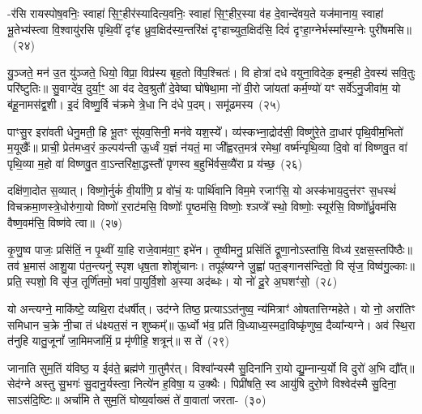-र॑सि रायस्पोष॒वनिः॒ स्वाहा॑ सि॒ꣳ॒हीर॑स्यादित्य॒वनिः॒ स्वाहा॑ सि॒ꣳ॒हीर॒स्या व॑ह दे॒वान्दे॑वय॒ते यज॑मानाय॒ स्वाहा॑ भू॒तेभ्य॑स्त्वा वि॒श्वायु॑रसि पृथि॒वीं दृꣳ॑ह ध्रुव॒क्षिद॑स्य॒न्तरि॑क्षं दृꣳहाच्युत॒क्षिद॑सि॒ दिवं॑ दृꣳहा॒ग्नेर्भस्मा᳚स्य॒ग्नेः पुरी॑षमसि॥~(२४)

{\anuvakamend[{नाम॑ सुप्रजा॒वनिः॒ स्वाहा॑ सि॒ꣳ॒हीः पञ्च॑त्रिꣳशच्च}]}%

यु॒ञ्जते॒ मन॑ उ॒त यु॑ञ्जते॒ धियो॒ विप्रा॒ विप्र॑स्य बृह॒तो वि॑प॒श्चितः॑। वि होत्रा॑ दधे वयुना॒विदेक॒ इन्म॒ही दे॒वस्य॑ सवि॒तुः परि॑ष्टुतिः॥ सु॒वाग्दे॑व॒ दुर्या॒ꣳ॒ आ व॑द देव॒श्रुतौ॑ दे॒वेष्वा घो॑षेथा॒मा नो॑ वी॒रो जा॑यतां कर्म॒ण्यो॑ यꣳ सर्वे॑\-ऽनु॒जीवा॑म॒ यो ब॑हू॒नामस॑द्व॒शी। इ॒दं विष्णु॒र्वि च॑क्रमे त्रे॒धा नि द॑धे प॒दम्। समू॑ढमस्य~(२५)

पाꣳसु॒र इरा॑वती धेनु॒मती॒ हि भू॒तꣳ सू॑यव॒सिनी॒ मन॑वे यश॒स्ये᳚। व्य॑स्कभ्ना॒द्रोद॑सी॒ विष्णु॑रे॒ते दा॒धार॑ पृथि॒वीम॒भितो॑ म॒यूखैः᳚॥ प्राची॒ प्रेत॑मध्व॒रं क॒ल्पय॑न्ती ऊ॒र्ध्वं य॒ज्ञं न॑यतं॒ मा जी᳚ह्वरत॒मत्र॑ रमेथां॒ वर्ष्म॑न्पृथि॒व्या दि॒वो वा॑ विष्णवु॒त वा॑ पृथि॒व्या म॒हो वा॑ विष्णवु॒त वा॒\-ऽन्तरि॑क्षा॒द्धस्तौ॑ पृणस्व ब॒हुभि॑र्वस॒व्यै॑रा प्र य॑च्छ॒~(२६)

दक्षि॑णा॒दोत स॒व्यात्। विष्णो॒र्नुकं॑ वी॒र्या॑णि॒ प्र वो॑चं॒ यः पार्थि॑वानि विम॒मे रजाꣳ॑सि॒ यो अस्क॑भाय॒दुत्त॑रꣳ स॒धस्थं॑ विचक्रमा॒णस्त्रे॒धोरु॑गा॒यो विष्णो॑ र॒राट॑मसि॒ विष्णोः᳚ पृ॒ष्ठम॑सि॒ विष्णोः॒ श्ञप्त्रे᳚ स्थो॒ विष्णोः॒ स्यूर॑सि॒ विष्णो᳚र्ध्रु॒वम॑सि वैष्ण॒वम॑सि॒ विष्ण॑वे त्वा॥~(२७)

{\anuvakamend[{अ॒स्य॒ य॒च्छैका॒न्नच॑त्वारि॒ꣳ॒शच्च॑}]}%

कृ॒णु॒ष्व पाजः॒ प्रसि॑तिं॒ न पृ॒थ्वीं या॒हि राजे॒वाम॑वा॒ꣳ॒ इभे॑न। तृ॒ष्वीमनु॒ प्रसि॑तिं द्रूणा॒नो\-ऽस्ता॑सि॒ विध्य॑ र॒क्षस॒स्तपि॑ष्ठैः॥ तव॑ भ्र॒मास॑ आशु॒या प॑त॒न्त्यनु॑ स्पृश धृष॒ता शोशु॑चानः। तपूꣴ॑ष्यग्ने जु॒ह्वा॑ पत॒ङ्गानस॑न्दितो॒ वि सृ॑ज॒ विष्व॑गु॒ल्काः॥ प्रति॒ स्पशो॒ वि सृ॑ज॒ तूर्णि॑तमो॒ भवा॑ पा॒युर्वि॒शो अ॒स्या अद॑ब्धः। यो नो॑ दू॒रे अ॒घशꣳ॑सो॒~(२८)

यो अन्त्यग्ने॒ माकि॑ष्टे॒ व्यथि॒रा द॑धर्षीत्। उद॑ग्ने तिष्ठ॒ प्रत्या\-ऽऽ\-त॑नुष्व॒ न्य॑मित्राꣳ॑ ओषतात्तिग्महेते। यो नो॒ अरा॑तिꣳ समिधान च॒क्रे नी॒चा तं ध॑क्ष्यत॒सं न शुष्कम्᳚॥ ऊ॒र्ध्वो भ॑व॒ प्रति॑ वि॒ध्याध्य॒स्मदा॒विष्कृ॑णुष्व॒ दैव्या᳚न्यग्ने। अव॑ स्थि॒रा त॑नुहि यातु॒जूनां᳚ जा॒मिमजा॑मिं॒ प्र मृ॑णीहि॒ शत्रून्॑॥ स ते॑~(२९)

जानाति सुम॒तिं य॑विष्ठ॒ य ईव॑ते॒ ब्रह्म॑णे गा॒तुमैर॑त्। विश्वा᳚न्यस्मै सु॒दिना॑नि रा॒यो द्यु॒म्नान्य॒र्यो वि दुरो॑ अ॒भि द्यौ᳚त्॥ सेद॑ग्ने अस्तु सु॒भगः॑ सु॒दानु॒र्यस्त्वा॒ नित्ये॑न ह॒विषा॒ य उ॒क्थैः। पिप्री॑षति॒ स्व आयु॑षि दुरो॒णे विश्वेद॑स्मै सु॒दिना॒ सा\-ऽस॑दि॒ष्टिः॥ अर्चा॑मि ते सुम॒तिं घोष्य॒र्वाख्सं ते॑ वा॒वाता॑ जरता-~(३०)


